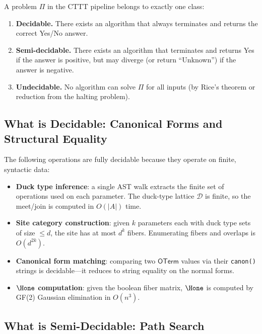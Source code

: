 \begin{definition}
\label{def:decidability}
A problem $\Pi$ in the CTTT pipeline belongs to exactly one class:
\begin{enumerate}
  \item \textbf{Decidable.} There exists an algorithm that always
    terminates and returns the correct Yes/No answer.
  \item \textbf{Semi-decidable.} There exists an algorithm that
    terminates and returns Yes if the answer is positive, but may
    diverge (or return ``Unknown'') if the answer is negative.
  \item \textbf{Undecidable.} No algorithm can solve $\Pi$ for all
    inputs (by Rice's theorem or reduction from the halting problem).
\end{enumerate}
\end{definition}

\subsection{What is Decidable: Canonical Forms and Structural Equality}

The following operations are fully decidable because they operate on
finite, syntactic data:

\begin{itemize}
  \item \textbf{Duck type inference}: a single AST walk extracts the
    finite set of operations used on each parameter.  The duck-type
    lattice $\mathcal{D}$ is finite, so the meet/join is computed in
    $O(|A|)$ time.
  \item \textbf{Site category construction}: given $k$ parameters each
    with duck type sets of size $\leq d$, the site has at most $d^k$
    fibers.  Enumerating fibers and overlaps is $O(d^{2k})$.
  \item \textbf{Canonical form matching}: comparing two
    $\mathsf{OTerm}$ values via their \texttt{canon()} strings is
    decidable---it reduces to string equality on the normal forms.
  \item \textbf{$\Hone$ computation}: given the boolean fiber matrix,
    $\Hone$ is computed by GF(2) Gaussian elimination in $O(n^3)$.
\end{itemize}

\subsection{What is Semi-Decidable: Path Search}


